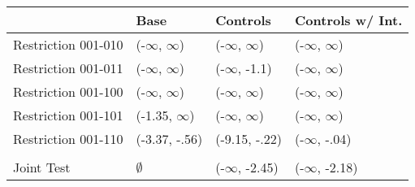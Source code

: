 \begin{tabular}{llll}
\toprule
{} &           Base &       Controls & Controls w/ Int. \\
\midrule
Restriction 001-010 &      (-$\infty$, $\infty$) &      (-$\infty$, $\infty$) &        (-$\infty$, $\infty$) \\
Restriction 001-011 &      (-$\infty$, $\infty$) &    (-$\infty$, -1.1) &        (-$\infty$, $\infty$) \\
Restriction 001-100 &      (-$\infty$, $\infty$) &      (-$\infty$, $\infty$) &        (-$\infty$, $\infty$) \\
Restriction 001-101 &    (-1.35, $\infty$) &      (-$\infty$, $\infty$) &        (-$\infty$, $\infty$) \\
Restriction 001-110 &  (-3.37, -.56) &  (-9.15, -.22) &      (-$\infty$, -.04) \\
\hline\\Joint Test  &         $\emptyset$ &   (-$\infty$, -2.45) &     (-$\infty$, -2.18) \\
\bottomrule
\end{tabular}

